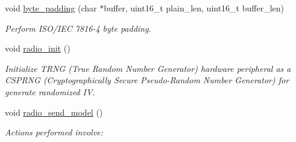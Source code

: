 \begin{DoxyCompactItemize}
void \mbox{\hyperlink{group___radio__module_ga2cca2e5e5a5f34888f1801e752c29eb3}{byte\+\_\+padding}} (char $\ast$buffer, uint16\+\_\+t plain\+\_\+len, uint16\+\_\+t buffer\+\_\+len)
\begin{DoxyCompactList}\small\item\em Perform I\+S\+O/\+I\+EC 7816-\/4 byte padding. \end{DoxyCompactList}\item 
void \mbox{\hyperlink{group___radio__module_gaaf9aff6a522103cc312457043baf7eca}{radio\+\_\+init}} ()
\begin{DoxyCompactList}\small\item\em Initialize T\+R\+NG (True Random Number Generator) hardware peripheral as a C\+S\+P\+R\+NG (Cryptographically Secure Pseudo-\/\+Random Number Generator) for generate randomized IV. \end{DoxyCompactList}\item 
void \mbox{\hyperlink{group___radio__module_ga5250a82de95a2d4e497dd1c580a92362}{radio\+\_\+send\+\_\+model}} ()
\begin{DoxyCompactList}\small\item\em Actions performed involve\+: \end{DoxyCompactList}\end{DoxyCompactItemize}
